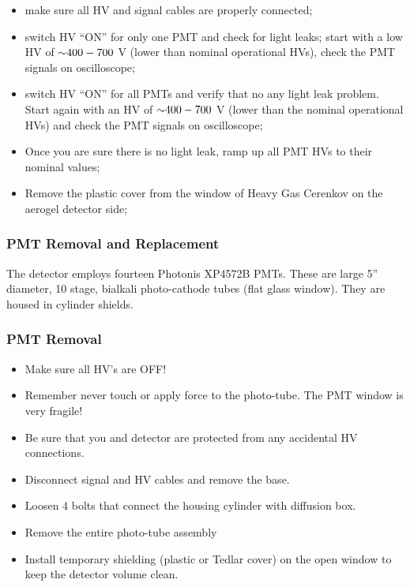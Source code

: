 \begin{itemize}
\item make sure all HV and
  signal cables are properly connected;
\item switch HV ``ON'' for only one
  PMT and check for light leaks; start with a low HV of $\mathord{\sim} 400-700$ V
  (lower than nominal operational HVs), check the PMT signals on
  oscilloscope;
\item switch HV ``ON'' for all PMTs and verify that no any
  light leak problem. Start again with an HV of $\mathord{\sim} 400-700$ V (lower than
  the nominal operational HVs) and check the PMT signals on
  oscilloscope;
\item Once you are sure there is no light leak, ramp up all
  PMT HVs to their nominal values;
\item Remove the plastic cover from
  the window of Heavy Gas Cerenkov on the aerogel detector side;
\end{itemize}

\subsubsection{PMT Removal and Replacement}

The detector employs fourteen Photonis XP4572B PMTs. These are large
5'' diameter, 10 stage, bialkali photo-cathode tubes (flat glass
window). They are housed in cylinder shields.

\subsubsection*{PMT Removal}

\begin{itemize}
\item Make sure all HV’s are OFF!
\item Remember never touch or apply force to the photo-tube. The PMT
  window is very fragile!
\item Be sure that you and detector are
  protected from any accidental HV connections.
\item Disconnect signal
  and HV cables and remove the base.
\item Loosen 4 bolts that connect
  the housing cylinder with diffusion box.
\item Remove the entire
  photo-tube assembly
\item Install temporary shielding (plastic or Tedlar
  cover) on the open window to keep the detector volume clean.
\end{itemize}

